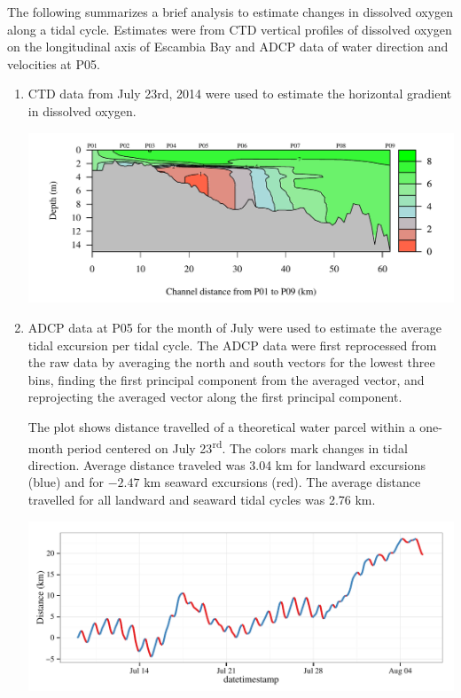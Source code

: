 \documentclass[letterpaper,12pt]{article}\usepackage[]{graphicx}\usepackage[]{color}
\makeatletter
\def\maxwidth{ %
  \ifdim\Gin@nat@width>\linewidth
    \linewidth
  \else
    \Gin@nat@width
  \fi
}
\makeatother
\begin{document}
The following summarizes a brief analysis to estimate changes in dissolved oxygen along a tidal cycle.  Estimates were from CTD vertical profiles of dissolved oxygen on the longitudinal axis of Escambia Bay and ADCP data of water direction and velocities at P05.  
\begin{enumerate}
\item{
CTD data from July 23rd, 2014 were used to estimate the horizontal gradient in dissolved oxygen.


{\centering \includegraphics[width=\textwidth]{figs/unnamed-chunk-1-1} 

}



}
\item{
ADCP data at P05 for the month of July were used to estimate the average tidal excursion per tidal cycle.  The ADCP data were first reprocessed from the raw data by averaging the north and south vectors for the lowest three bins, finding the first principal component from the averaged vector, and reprojecting the averaged vector along the first principal component.  


The plot shows distance travelled of a theoretical water parcel within a one-month period centered on July 23\textsuperscript{rd}.  The colors mark changes in tidal direction.  Average distance traveled was 3.04 km for landward excursions (blue) and for \ensuremath{-2.47} km seaward excursions (red).  The average distance travelled for all landward and seaward tidal cycles was 2.76 km.


{\centering \includegraphics[width=\maxwidth]{figs/unnamed-chunk-3-1} 

}}
\end{enumerate}
\end{document}
